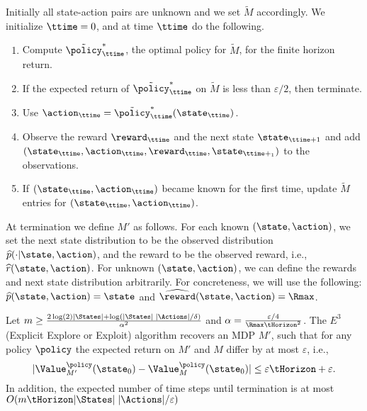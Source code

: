 Initially all state-action pairs are unknown and we set $\tilde{M}$
accordingly. We initialize $\ttime=0$, and at time $\ttime$ do the
following.
\begin{enumerate}
\item
Compute $\tilde{\policy}^*_\ttime$, the optimal policy for
$\tilde{M}$, for the finite horizon return.
\item
If the expected return of $\tilde{\policy}^*_\ttime$ on $\tilde{M}$
is less than $\varepsilon/2$, then terminate.
\item
Use $\action_\ttime=\tilde{\policy}^*_\ttime(\state_{\ttime})$.
\item
Observe the reward $\reward_\ttime$ and the next state
$\state_{\ttime+1}$ and add
$(\state_\ttime,\action_\ttime,\reward_\ttime,\state_{\ttime+_1})$
to the observations.
\item
If $(\state_\ttime,\action_\ttime)$ became known for the first time,
update $\tilde{M}$ entries for $(\state_\ttime,\action_\ttime)$.
\end{enumerate}

At termination we define $M'$ as follows. For each known
$(\state,\action)$, we set the next state distribution to be the
observed distribution $\widehat{p}(\cdot|\state,\action)$, and the
reward to be the observed reward, i.e.,
$\widehat{r}(\state,\action)$.
%
For unknown $(\state,\action)$, we can define the rewards and next
state distribution arbitrarily. For concreteness, we will use the
following: $\widehat{p}(\state,\action)=\state$ and
$\widehat{\reward}(\state,\action)=\Rmax$.

\begin{theorem}
Let $m\geq
\frac{2\log(2)|\States|+\log(|\States|\;|\Actions|/\delta)}{\alpha^2}$
and $\alpha=\frac{\varepsilon/4}{\Rmax \tHorizon^2}$.
%
The $E^3$ (Explicit Explore or Exploit) algorithm recovers an MDP
$M'$, such that for any policy $\policy$ the expected return on $M'$
and $M$ differ by at most $\varepsilon$, i.e.,
$$|\Value^\policy_{M'}(\state_0)-\Value^\policy_M(\state_0) |\leq
\varepsilon\tHorizon+\varepsilon. $$
 In addition, the expected number of time
steps until termination is at most $O(m\tHorizon
|\States|\;|\Actions|/\varepsilon)$
\end{theorem}

